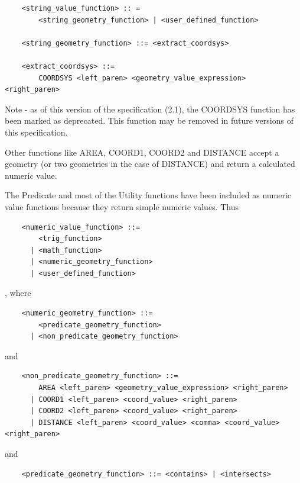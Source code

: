 \documentclass[11pt,a4paper]{ivoa}
\begin{document}
\begin{verbatim}
    <string_value_function> :: =
        <string_geometry_function> | <user_defined_function>

    <string_geometry_function> ::= <extract_coordsys>

    <extract_coordsys> ::=
        COORDSYS <left_paren> <geometry_value_expression> <right_paren>
\end{verbatim}

Note - as of this version of the specification (2.1), the COORDSYS function has
been marked as deprecated. This function may be removed in future versions
of this specification.

Other functions like AREA, COORD1, COORD2 and DISTANCE accept a geometry (or
two geometries in the case of DISTANCE) and return a calculated numeric value.

The Predicate and most of the Utility functions have been included as numeric
value functions because they return simple numeric values. Thus

\begin{verbatim}
    <numeric_value_function> ::=
        <trig_function>
      | <math_function>
      | <numeric_geometry_function>
      | <user_defined_function>
\end{verbatim}

, where

\begin{verbatim}
    <numeric_geometry_function> ::=
        <predicate_geometry_function>
      | <non_predicate_geometry_function>
\end{verbatim}

and

\begin{verbatim}
    <non_predicate_geometry_function> ::=
        AREA <left_paren> <geometry_value_expression> <right_paren>
      | COORD1 <left_paren> <coord_value> <right_paren>
      | COORD2 <left_paren> <coord_value> <right_paren>
      | DISTANCE <left_paren> <coord_value> <comma> <coord_value> <right_paren>
\end{verbatim}

and

\begin{verbatim}
    <predicate_geometry_function> ::= <contains> | <intersects>
\end{verbatim}

\clearpage
\label{sec:geom.functions.definitions}
\end{document}
